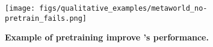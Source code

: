 \begin{figure}
    \centering
    \texttt{[image: figs/qualitative\_examples/metaworld\_no-pretrain\_fails.png]}
    \caption{\small \textbf{Example of pretraining improve \orca{}'s performance.} }
    \label{fig:meta_no-pretrain_fail}
\end{figure}
